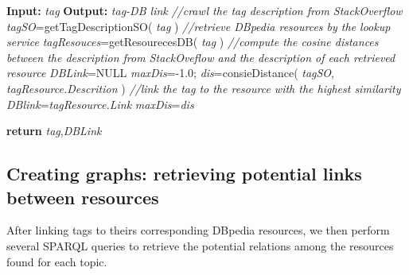\begin{algorithm}%
\begin{algorithmic}[1]
\label{algo:chp6link}
\State \textbf{Input:} \textit{ tag}
\State \textbf{Output:} \textit{tag-DB link}
\State \textit{//crawl the tag description from StackOverflow}
\State \textit{tagSO}=getTagDescriptionSO( \textit{tag} )
\State \textit{//retrieve DBpedia resources by the lookup service}
\State \textit{tagResouces}=getResourecesDB( \textit{tag} )
\State \textit{//compute the cosine distances between the description from StackOveflow and the description of each retrieved resource}
\State \textit{DBLink}=NULL
\State \textit{maxDis}=-1.0;
\State \textit{dis}=consieDistance( \textit{tagSO}, \textit{tagResource.Descrition} )
\State \textit{//link the tag to the resource with the highest similarity}
\State \textit{DBlink}=\textit{tagResource.Link}
\State \textit{maxDis}=\textit{dis}
\EndIf

\EndFor
\State \textbf{return} \textit{tag},\textit{DBLink}

\end{algorithmic}
\end{algorithm}







\subsection{Creating graphs: retrieving potential links between resources}
After linking tags to theirs corresponding DBpedia resources, we then perform several SPARQL queries to retrieve the potential relations among the resources found for each topic. 


